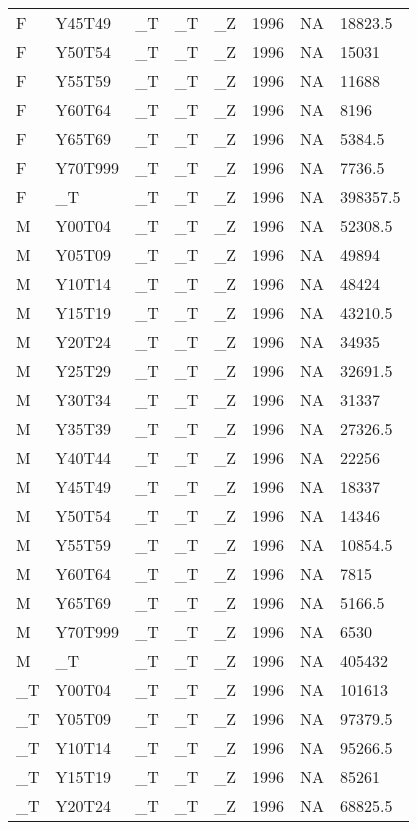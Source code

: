 \begin{longtable}[t]{llllllll}
F & Y45T49 & \_T & \_T & \_Z & 1996 & NA & 18823.5\\
F & Y50T54 & \_T & \_T & \_Z & 1996 & NA & 15031\\
F & Y55T59 & \_T & \_T & \_Z & 1996 & NA & 11688\\
F & Y60T64 & \_T & \_T & \_Z & 1996 & NA & 8196\\
\addlinespace
F & Y65T69 & \_T & \_T & \_Z & 1996 & NA & 5384.5\\
F & Y70T999 & \_T & \_T & \_Z & 1996 & NA & 7736.5\\
F & \_T & \_T & \_T & \_Z & 1996 & NA & 398357.5\\
M & Y00T04 & \_T & \_T & \_Z & 1996 & NA & 52308.5\\
M & Y05T09 & \_T & \_T & \_Z & 1996 & NA & 49894\\
\addlinespace
M & Y10T14 & \_T & \_T & \_Z & 1996 & NA & 48424\\
M & Y15T19 & \_T & \_T & \_Z & 1996 & NA & 43210.5\\
M & Y20T24 & \_T & \_T & \_Z & 1996 & NA & 34935\\
M & Y25T29 & \_T & \_T & \_Z & 1996 & NA & 32691.5\\
M & Y30T34 & \_T & \_T & \_Z & 1996 & NA & 31337\\
\addlinespace
M & Y35T39 & \_T & \_T & \_Z & 1996 & NA & 27326.5\\
M & Y40T44 & \_T & \_T & \_Z & 1996 & NA & 22256\\
M & Y45T49 & \_T & \_T & \_Z & 1996 & NA & 18337\\
M & Y50T54 & \_T & \_T & \_Z & 1996 & NA & 14346\\
M & Y55T59 & \_T & \_T & \_Z & 1996 & NA & 10854.5\\
\addlinespace
M & Y60T64 & \_T & \_T & \_Z & 1996 & NA & 7815\\
M & Y65T69 & \_T & \_T & \_Z & 1996 & NA & 5166.5\\
M & Y70T999 & \_T & \_T & \_Z & 1996 & NA & 6530\\
M & \_T & \_T & \_T & \_Z & 1996 & NA & 405432\\
\_T & Y00T04 & \_T & \_T & \_Z & 1996 & NA & 101613\\
\addlinespace
\_T & Y05T09 & \_T & \_T & \_Z & 1996 & NA & 97379.5\\
\_T & Y10T14 & \_T & \_T & \_Z & 1996 & NA & 95266.5\\
\_T & Y15T19 & \_T & \_T & \_Z & 1996 & NA & 85261\\
\_T & Y20T24 & \_T & \_T & \_Z & 1996 & NA & 68825.5\\

\end{longtable}
